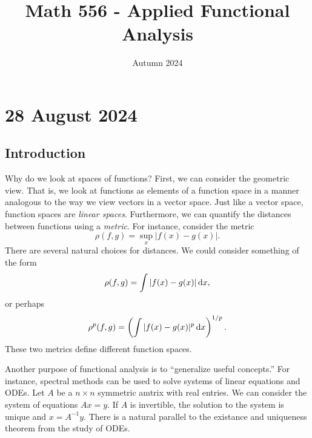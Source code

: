 \documentclass{article}
\title{Math 556 - Applied Functional Analysis}
\author{Autumn 2024}
\begin{document}
  
\frenchspacing
\maketitle 
\section*{28 August 2024}
\subsection*{Introduction}
Why do we look at spaces of functions? First, we can consider the geometric view. That is, we look at functions as elements of a function space in a manner analogous to the way we view vectors in a vector space. Just like a vector space, function spaces are \textit{linear spaces}. Furthermore, we can quantify the distances between functions using a \textit{metric}. For instance, consider the metric 
    \[
        \rho(f, g) = \sup_{x} |f(x) - g(x)|.
    \]
There are several natural choices for distances. We could consider something of the form 
    \[
        \rho(f, g) = \int |f(x) - g(x) | \, \text{d}x,
    \]
or perhaps
    \[
        \rho^p(f, g) = \left(\int |f(x) - g(x)|^p \, \text{d}x \right)^{1/p}.
    \]
These two metrics define different function spaces. 
\newpar

Another purpose of functional analysis is to ``generalize useful concepts.'' For instance, spectral methods can be used to solve systems of linear equations and ODEs. Let $A$ be a $n \times n$ symmetric amtrix with real entries. We can consider the system of equations $Ax = y$. If $A$ is invertible, the solution to the system is unique and $x = A^{-1} y$. There is a natural parallel to the existance and uniqueness theorem from the study of ODEs.
\newpar
\end{document}
